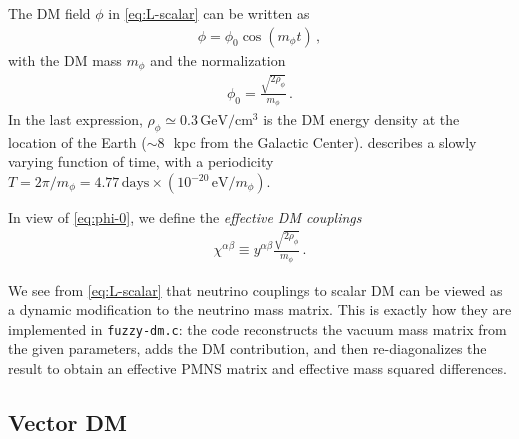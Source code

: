 \documentclass{scrartcl}
\begin{document}
The DM field $\phi$ in \cref{eq:L-scalar} can be written as
\begin{align}
  \phi = \phi_0 \cos(m_\phi t) \,,
  \label{eq:phi-osc}
\end{align}
with the DM mass $m_\phi$ and the normalization
\begin{align}
  \phi_0 = \frac{\sqrt{2 \rho_\phi}}{m_\phi} \,.
  \label{eq:phi-0}
\end{align}
In the last expression, $\rho_\phi \simeq 0.3\,\text{GeV}/\text{cm}^3$ is the
DM energy density at the location of the Earth ($\sim 8$~\,kpc from the
Galactic Center).  describes a slowly varying
function of time, with a periodicity $T = 2\pi/m_\phi = 4.77\,\text{days}
\times (10^{-20}\,\text{eV} / m_\phi)$.

In view of \cref{eq:phi-0}, we define the \emph{effective DM couplings}
\begin{align}
  \chi^{\alpha\beta} \equiv y^{\alpha\beta} \frac{\sqrt{2 \rho_\phi}}{m_\phi} \,.
  \label{eq:chi-dm}
\end{align}

We see from \cref{eq:L-scalar} that neutrino couplings to scalar DM
can be viewed as a dynamic modification to the neutrino mass matrix.
This is exactly how they are implemented in {\tt fuzzy-dm.c}: the code
reconstructs the vacuum mass matrix from the given parameters, adds
the DM contribution, and then re-diagonalizes the result to obtain an
effective PMNS matrix and effective mass squared differences.


\subsection{Vector DM}
\end{document}
